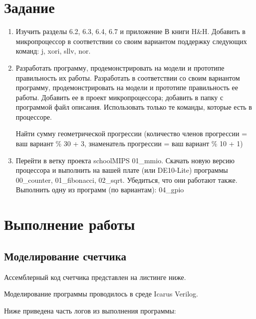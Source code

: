 \documentclass[a4paper,14pt]{article}
\begin{document}
	
	\tableofcontents
	\pagebreak
	\section{Задание}
	
	\begin{enumerate}
		\item Изучить разделы 6.2, 6.3, 6.4, 6.7 и приложение В книги H\&H.
		Добавить в микропроцессор в соответствии со своим вариантом	поддержку следующих команд: j, xori, sllv, nor.
		
		\item Разработать программу, продемонстрировать на модели и прототипе правильность их работы.
		Разработать в соответствии со своим вариантом программу, продемонстрировать на модели и прототипе правильность ее работы.
		Добавить ее в проект микропроцессора; добавить в папку с программой файл описания.
		Использовать только те команды, которые есть в процессоре.
		
		Найти сумму геометрической прогрессии (количество членов прогрессии = ваш
		вариант \% 30 + 3, знаменатель прогрессии = ваш вариант \% 10 + 1)
		
		\item Перейти в ветку проекта schoolMIPS 01\_mmio.
		Скачать новую версию процессора и выполнить на вашей плате (или DE10-Lite)
		программы 00\_counter, 01\_fibonacci, 02\_sqrt. Убедиться, что они работают также.
		Выполнить одну из программ (по вариантам): 04\_gpio
	\end{enumerate}

	
	\section{Выполнение работы}
	
	\subsection{Моделирование счетчика}
	
	Ассемблерный код счетчика представлен на листинге ниже.
	
	{\small {}}
	
	Моделирование программы проводилось в среде Icarus Verilog.
	
	Ниже приведена часть логов из выполнения программы:
	
\end{document}

